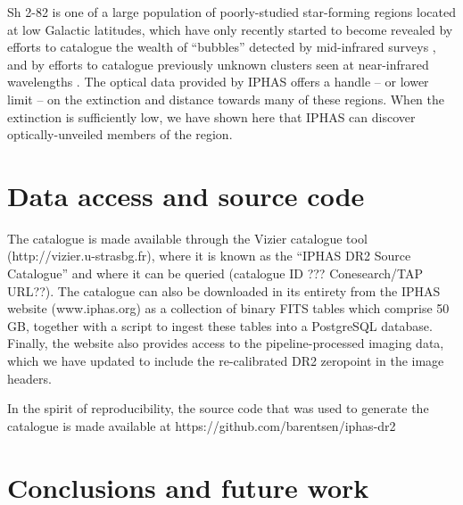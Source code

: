 \documentclass[useAMS,usenatbib]{mn2e}
\begin{document}

Sh 2-82 is one of a large population of poorly-studied star-forming regions
located at low Galactic latitudes,
which have only recently started to become revealed
by efforts to catalogue the wealth of ``bubbles'' detected
by mid-infrared surveys \cite[e.g.][]{Churchwell2006,Simpson2012},
and by efforts to catalogue previously unknown clusters seen 
at near-infrared wavelengths \cite[e.g.][]{Bica2003}.
The optical data provided by IPHAS offers a handle -- or lower limit --
on the extinction and distance towards many of these regions.
When the extinction is sufficiently low,
we have shown here that IPHAS can discover optically-unveiled 
members of the region.


\section{Data access and source code}
\label{sec:dataaccess}

The catalogue is made available through the Vizier
catalogue tool (http://vizier.u-strasbg.fr),
where it is known as the ``IPHAS DR2 Source Catalogue''
and where it can be queried
(catalogue ID ??? Conesearch/TAP URL??).
The catalogue can also be downloaded in its entirety
from the IPHAS website (www.iphas.org) as a collection 
of binary FITS tables which comprise 50\,GB,
together with a script
to ingest these tables into a PostgreSQL database.
Finally, the website also provides access to the pipeline-processed
imaging data, which we have updated to include
the re-calibrated DR2 zeropoint in the image headers.

In the spirit of reproducibility,
the source code that was used to generate
the catalogue is made available at
https://github.com/barentsen/iphas-dr2

\section{Conclusions and future work}
\label{sec:conclusions}
\end{document}
